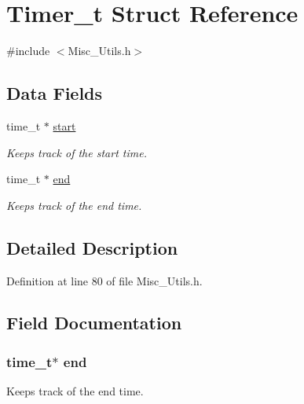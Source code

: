 \hypertarget{struct_timer__t}{}\section{Timer\+\_\+t Struct Reference}
\label{struct_timer__t}


{\ttfamily \#include $<$Misc\+\_\+\+Utils.\+h$>$}

\subsection*{Data Fields}
\begin{DoxyCompactItemize}
\item 
time\+\_\+t $\ast$ \hyperlink{struct_timer__t_a9e8ad159996fcf54d4bdf8d6ec7199b7}{start}
\begin{DoxyCompactList}\small\item\em Keeps track of the start time. \end{DoxyCompactList}\item 
time\+\_\+t $\ast$ \hyperlink{struct_timer__t_ae5d7b339cd8bb4bb07a7678a43a352ec}{end}
\begin{DoxyCompactList}\small\item\em Keeps track of the end time. \end{DoxyCompactList}\end{DoxyCompactItemize}


\subsection{Detailed Description}


Definition at line 80 of file Misc\+\_\+\+Utils.\+h.



\subsection{Field Documentation}
\hypertarget{struct_timer__t_ae5d7b339cd8bb4bb07a7678a43a352ec}{}
\subsubsection[{end}]{\setlength{\rightskip}{0pt plus 5cm}time\+\_\+t$\ast$ end}\label{struct_timer__t_ae5d7b339cd8bb4bb07a7678a43a352ec}


Keeps track of the end time. 



